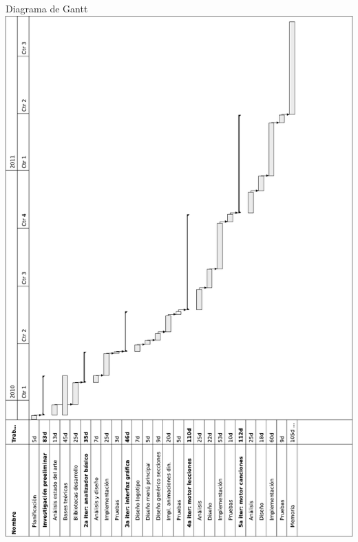 {\begin{frame}{Diagrama de Gantt}
    \includegraphics[angle=270, width=\textwidth]{imagenes/imagen_diagrama_gantt}
  \end{frame}
}

